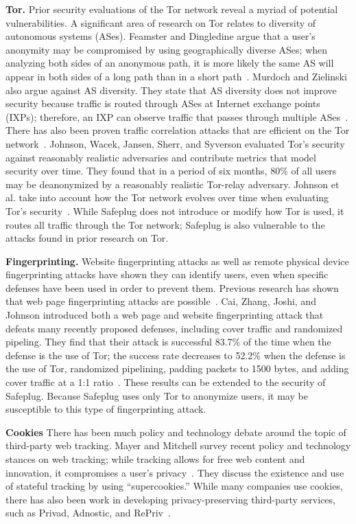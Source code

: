 \documentclass[conference]{IEEEtran}
\begin{document}
{\bf Tor.} Prior security evaluations of the Tor network reveal a myriad of potential vulnerabilities.  A significant area of research on Tor relates to diversity of autonomous systems (ASes).  Feamster and Dingledine argue that a user's anonymity may be compromised by using geographically diverse ASes; when analyzing both sides of an anonymous path, it is more likely the same AS will appear in both sides of a long path than in a short path~\cite{feamster}.  Murdoch and Zielinski also argue against AS diversity.  They state that AS diversity does not improve security because traffic is routed through ASes at Internet exchange points (IXPs); therefore, an IXP can observe traffic that passes through multiple ASes~\cite{murdoch2}.  There has also been proven traffic correlation attacks that are efficient on the Tor network~\cite{murdoch, overlier}.  Johnson, Wacek, Jansen, Sherr, and Syverson evaluated Tor's security against reasonably realistic adversaries and contribute metrics that model security over time.  They found that in a period of six months, 80\% of all users may be deanonymized by a reasonably realistic Tor-relay adversary.  Johnson et al. take into account how the Tor network evolves over time when evaluating Tor's security~\cite{tor2}.  While Safeplug does not introduce or modify how Tor is used, it routes all traffic through the Tor network; Safeplug is also vulnerable to the attacks found in prior research on Tor.  

{\bf Fingerprinting.}  Website fingerprinting attacks as well as remote physical device fingerprinting attacks have shown they can identify users, even when specific defenses have been used in order to prevent them. Previous research has shown that web page fingerprinting attacks are possible~\cite{dyer, herrmann, panchenko}.  Cai, Zhang, Joshi, and Johnson introduced both a web page and website fingerprinting attack that defeats many recently proposed defenses, including cover traffic and randomized pipeling.  They find that their attack is successful 83.7\% of the time when the defense is the use of Tor; the success rate decreases to 52.2\% when the defense is the use of Tor, randomized pipelining, padding packets to 1500 bytes, and adding cover traffic at a 1:1 ratio~\cite{fingerprint1}.  These results can be extended to the security of Safeplug.  Because Safeplug uses only Tor to anonymize users, it may be susceptible to this type of fingerprinting attack.

{\bf Cookies} There has been much policy and technology debate around the topic of third-party web tracking.  Mayer and Mitchell survey recent policy and technology stances on web tracking; while tracking allows for free web content and innovation, it compromises a user's privacy~\cite{commercial2}.  They discuss the existence and use of stateful tracking by using ``supercookies.''  While many companies use cookies, there has also been work in developing privacy-preserving third-party services, such as Privad, Adnostic, and RePriv~\cite{guha, toubiana, fredrikson}.
\end{document}
